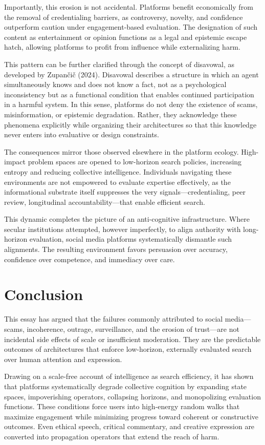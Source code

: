 \documentclass[12pt]{article}
\begin{document}
Importantly, this erosion is not accidental. Platforms benefit economically from the removal of credentialing barriers, as controversy, novelty, and confidence outperform caution under engagement-based evaluation. The designation of such content as entertainment or opinion functions as a legal and epistemic escape hatch, allowing platforms to profit from influence while externalizing harm.

This pattern can be further clarified through the concept of disavowal, as developed by Zupančič (2024). Disavowal describes a structure in which an agent simultaneously knows and does not know a fact, not as a psychological inconsistency but as a functional condition that enables continued participation in a harmful system. In this sense, platforms do not deny the existence of scams, misinformation, or epistemic degradation. Rather, they acknowledge these phenomena explicitly while organizing their architectures so that this knowledge never enters into evaluative or design constraints.

The consequences mirror those observed elsewhere in the platform ecology. High-impact problem spaces are opened to low-horizon search policies, increasing entropy and reducing collective intelligence. Individuals navigating these environments are not empowered to evaluate expertise effectively, as the informational substrate itself suppresses the very signals—credentialing, peer review, longitudinal accountability—that enable efficient search.

This dynamic completes the picture of an anti-cognitive infrastructure. Where secular institutions attempted, however imperfectly, to align authority with long-horizon evaluation, social media platforms systematically dismantle such alignments. The resulting environment favors persuasion over accuracy, confidence over competence, and immediacy over care.

\section{Conclusion}

This essay has argued that the failures commonly attributed to social media—scams, incoherence, outrage, surveillance, and the erosion of trust—are not incidental side effects of scale or insufficient moderation. They are the predictable outcomes of architectures that enforce low-horizon, externally evaluated search over human attention and expression.

Drawing on a scale-free account of intelligence as search efficiency, it has shown that platforms systematically degrade collective cognition by expanding state spaces, impoverishing operators, collapsing horizons, and monopolizing evaluation functions. These conditions force users into high-energy random walks that maximize engagement while minimizing progress toward coherent or constructive outcomes. Even ethical speech, critical commentary, and creative expression are converted into propagation operators that extend the reach of harm.
\end{document}
